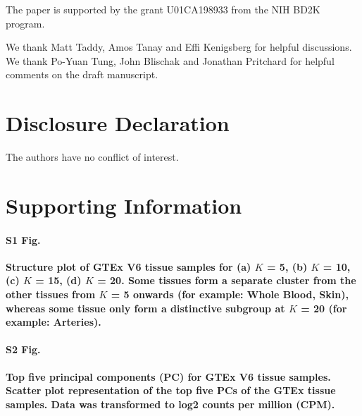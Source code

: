 \documentclass[10pt,letterpaper]{article}
\begin{document}
The paper is supported by the grant U01CA198933 from the NIH BD2K program.

We thank Matt Taddy, Amos Tanay and Effi Kenigsberg for helpful discussions. We thank Po-Yuan Tung, John Blischak and Jonathan Pritchard for helpful comments on the draft manuscript.

\section*{Disclosure Declaration}

The authors have no conflict of interest.

\nolinenumbers



\section*{Supporting Information}
\paragraph*{S1 Fig.}
\label{figS1}
\bf{Structure plot of GTEx V6 tissue samples for (a) $K$ = 5, (b) $K$ = 10, (c) $K$ = 15, (d) $K$ = 20.} Some tissues form a separate cluster from the other tissues from $K$ = 5 onwards (for example: Whole Blood, Skin), whereas some tissue only form a distinctive subgroup at $K$ = 20 (for example: Arteries).

\paragraph*{S2 Fig.}
\label{figS2}
\bf{Top five principal components (PC) for GTEx V6 tissue samples.} Scatter plot
representation of the top five PCs of the GTEx tissue samples. Data was transformed to log2 counts per million (CPM).
\end{document}
